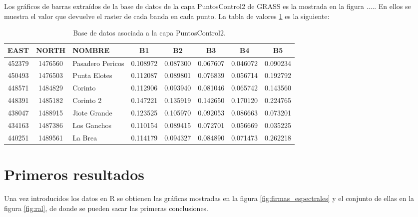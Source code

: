 Los gráficos de barras extraídos de la base de datos de la capa PuntosControl2 de GRASS es la mostrada en la figura ..... En ellos se muestra el valor que devuelve el raster de cada banda en cada punto. La tabla de valores \ref{tab:tabla_puntos} es la siguiente:

\begin{table}[ht]
	\centering
	\caption[Base de datos de puntos de control]{Base de datos asociada a la capa PuntosControl2.}
	\begin{tabular}{|c|c|l|c|c|c|c|c|}
	\hline
	EAST & NORTH & NOMBRE & B1 & B2 & B3 & B4 & B5\\
	\hline
	452379 & 1476560 & Pasadero Pericos & 0.108972 & 0.087300 & 0.067607 & 0.046072 & 0.090234\\
	\hline
	450493 & 1476503 & Punta Elotes & 0.112087 & 0.089801 & 0.076839 & 0.056714 & 0.192792\\
	\hline
	448571 & 1484829 & Corinto & 0.112906 & 0.093940 & 0.081046 & 0.065742 & 0.143560\\
	\hline
	448391 & 1485182 & Corinto 2 & 0.147221 & 0.135919 & 0.142650 & 0.170120 & 0.224765\\
	\hline
	438047 & 1488915 & Jiote Grande & 0.123525 & 0.105970 & 0.092053 & 0.086663 & 0.073201\\
	\hline
	434163 & 1487386 & Los Ganchos & 0.110154 & 0.089415 & 0.072701 & 0.056669 & 0.035225\\
	\hline
	440251 & 1489561 & La Brea & 0.114179 & 0.094327 & 0.084890 & 0.071473 & 0.262218\\
	\hline
	\end{tabular}
	\label{tab:tabla_puntos}
\end{table}

\section{Primeros resultados}
Una vez introducidos los datos en R se obtienen las gráficas mostradas en la figura \ref{fig:firmas_espectrales} y el conjunto de ellas en la figura \ref{fig:ral}, de donde se pueden sacar las primeras conclusiones.\Sep

